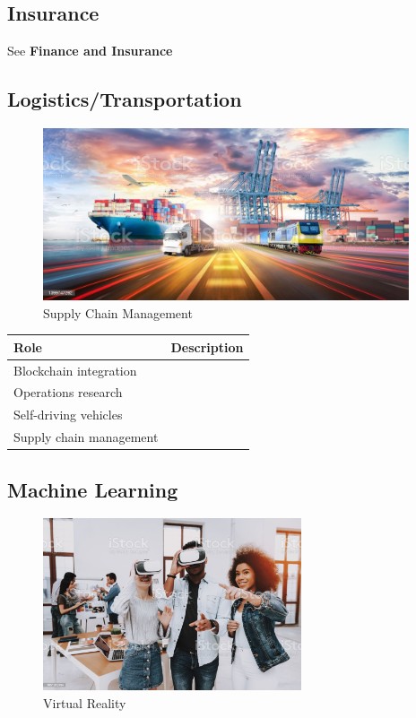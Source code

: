 \subsection{Insurance}
See \textbf{Finance and Insurance}

\subsection{Logistics/Transportation}

\begin{figure}[H]
	\begin{center}
		\caption{Supply Chain Management}
		\vskip 4pt
		\includegraphics[height=2in]{images/careers/istockphoto-1399747292-1024x1024.jpg}
	\end{center}
\end{figure}

\begin{table}[H]
	\begin{center}
		\begin{tabular}{p{1.3in}|p{3in}} 
			\textbf{Role} & \textbf{Description}\\
			\hline
			Blockchain integration & \\
			\hline
			Operations research & \\
			\hline
			Self-driving vehicles & \\
			\hline
			Supply chain management & \\
		\end{tabular}
	\end{center}
\end{table}

\subsection{Machine Learning}

\begin{figure}[H]
	\begin{center}
		\caption{Virtual Reality}
		\vskip 4pt
		\includegraphics[height=2in]{images/careers/istockphoto-1051052494-1024x1024.jpg}
	\end{center}
\end{figure}

